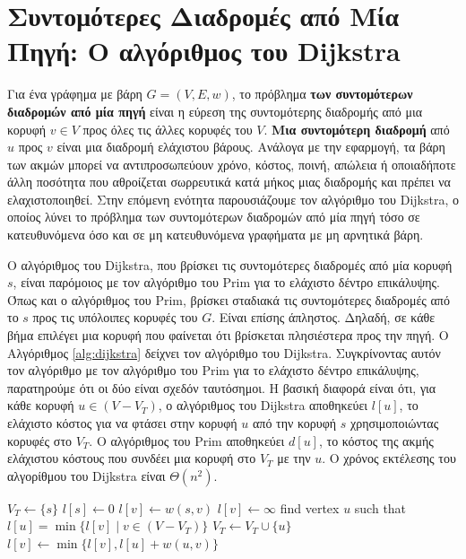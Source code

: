 \documentclass[12pt,a4paper]{article} %
\begin{document}
\section{Συντομότερες Διαδρομές από Μία Πηγή: Ο αλγόριθμος του Dijkstra}

Για ένα γράφημα με βάρη $G = (V, E, w)$, το πρόβλημα \textbf{των συντομότερων διαδρομών από μία πηγή} είναι η εύρεση της συντομότερης διαδρομής από μια κορυφή $v \in V$ προς όλες τις άλλες κορυφές του $V$. \textbf{Μια συντομότερη διαδρομή} από $u$ προς $v$ είναι μια διαδρομή ελάχιστου βάρους. Ανάλογα με την εφαρμογή, τα βάρη των ακμών μπορεί να αντιπροσωπεύουν χρόνο, κόστος, ποινή, απώλεια ή οποιαδήποτε άλλη ποσότητα που αθροίζεται σωρρευτικά κατά μήκος μιας διαδρομής και πρέπει να ελαχιστοποιηθεί. Στην επόμενη ενότητα παρουσιάζουμε τον αλγόριθμο του Dijkstra, ο οποίος λύνει το πρόβλημα των συντομότερων διαδρομών από μία πηγή τόσο σε κατευθυνόμενα όσο και σε μη κατευθυνόμενα γραφήματα με μη αρνητικά βάρη.

Ο αλγόριθμος του Dijkstra, που βρίσκει τις συντομότερες διαδρομές από μία κορυφή $s$, είναι παρόμοιος με τον αλγόριθμο του Prim για το ελάχιστο δέντρο επικάλυψης. Όπως και ο αλγόριθμος του Prim, βρίσκει σταδιακά τις συντομότερες διαδρομές από το $s$ προς τις υπόλοιπες κορυφές του $G$. Είναι επίσης άπληστος. Δηλαδή, σε κάθε βήμα επιλέγει μια κορυφή που φαίνεται ότι βρίσκεται πλησιέστερα προς την πηγή. Ο Αλγόριθμος \ref{alg:dijkstra} δείχνει τον αλγόριθμο του Dijkstra. Συγκρίνοντας αυτόν τον αλγόριθμο με τον αλγόριθμο του Prim για το ελάχιστο δέντρο επικάλυψης, παρατηρούμε ότι οι δύο είναι σχεδόν ταυτόσημοι. Η βασική διαφορά είναι ότι, για κάθε κορυφή $u \in (V - V_T)$, ο αλγόριθμος του Dijkstra αποθηκεύει $l[u]$, το ελάχιστο κόστος για να φτάσει στην κορυφή $u$ από την κορυφή $s$ χρησιμοποιώντας κορυφές στο $V_T$. O αλγόριθμος του Prim αποθηκεύει $d[u]$, το κόστος της ακμής ελάχιστου κόστους που συνδέει μια κορυφή στο $V_T$ με την $u$. Ο χρόνος εκτέλεσης του αλγορίθμου του Dijkstra είναι $\Theta(n^2)$.

\begin{algorithm}[H]
\begin{algorithmic}[1]
    \State $V_T \gets \{s\}$
    \State $l[s] \gets 0$
            \State $l[v] \gets w(s, v)$
        \Else
            \State $l[v] \gets \infty$
        \EndIf
    \EndFor
        \State find vertex $u$ such that $l[u] = \min\{l[v] \mid v \in (V - V_T)\}$
        \State $V_T \gets V_T \cup \{u\}$
            \State $l[v] \gets \min\{l[v], l[u] + w(u, v)\}$
        \EndFor
    \EndWhile
\EndProcedure
\end{algorithmic}
\end{algorithm}
\end{document}
